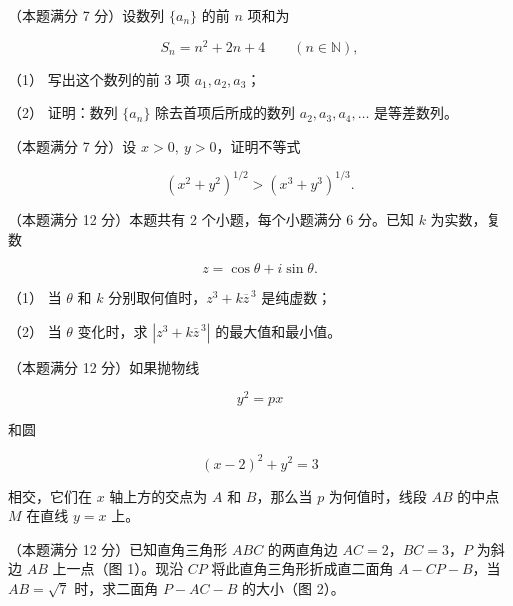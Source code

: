 \begin{question}
（本题满分 7 分）设数列 $\{a_n\}$ 的前 $n$ 项和为

\nopagebreak[4]
\[
S_n=n^2+2n+4\qquad(n\in\mathbb N),
\]

（1） 写出这个数列的前 $3$ 项 $a_1,a_2,a_3$；

（2） 证明：数列 $\{a_n\}$ 除去首项后所成的数列 $a_2,a_3,a_4,\ldots$ 是等差数列。

\end{question}
\begin{question}
（本题满分 7 分）设 $x>0,\ y>0$，证明不等式

\nopagebreak[4]
\[
(x^2+y^2)^{1/2}>(x^3+y^3)^{1/3}.
\]

\end{question}
\begin{question}
（本题满分 12 分）本题共有 2 个小题，每个小题满分 6 分。已知 $k$ 为实数，复数

\nopagebreak[4]
\[
z=\cos\theta+i\sin\theta.
\]

（1） 当 $\theta$ 和 $k$ 分别取何值时，$z^3+k\overline z^{\,3}$ 是纯虚数；

（2） 当 $\theta$ 变化时，求 $|z^3+k\overline z^{\,3}|$ 的最大值和最小值。

\Needspace{0.4\textheight}
\end{question}
\begin{question}
（本题满分 12 分）如果抛物线

\nopagebreak[4]
\[
y^2=px
\]

和圆

\nopagebreak[4]
\[
(x-2)^2+y^2=3
\]

相交，它们在 $x$ 轴上方的交点为 $A$ 和 $B$，那么当 $p$ 为何值时，线段 $AB$ 的中点 $M$ 在直线 $y=x$ 上。
\nopagebreak[4]
\begin{center}\end{center}
\nopagebreak[4]
\Needspace{0.4\textheight}
\end{question}
\begin{question}
（本题满分 12 分）已知直角三角形 $ABC$ 的两直角边 $AC=2$，$BC=3$，$P$ 为斜边 $AB$ 上一点（图 1）。现沿 $CP$ 将此直角三角形折成直二面角 $A\mathbin{-}CP\mathbin{-}B$，当 $AB=\sqrt7$ 时，求二面角 $P\mathbin{-}AC\mathbin{-}B$ 的大小（图 2）。
\nopagebreak[4]
\begin{center}\end{center}
\nopagebreak[4]
\nopagebreak[4]
\begin{center}\end{center}
\nopagebreak[4]

\end{question}